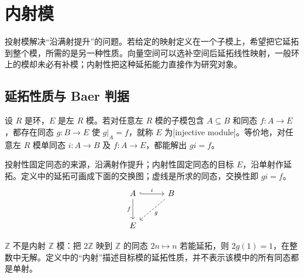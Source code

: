 
\section{内射模}
\label{b2:sec:0702}

投射模解决“沿满射提升”的问题。若给定的映射定义在一个子模上，希望把它延拓到整个模，所需的是另一种性质。向量空间可以选补空间后延拓线性映射，一般环上的模却未必有补模；内射性把这种延拓能力直接作为研究对象。

%
%

\subsection{延拓性质与 Baer 判据}
\label{b2:subsec:0702:01}

\begin{definition}\label{b2:def:injective-module}
	设 \(R\) 是环，\(E\) 是左 \(R\) 模。若对任意左 \(R\) 模的子模包含 \(A\subseteq B\) 和同态 \(f:A\to E\)，都存在同态 \(g:B\to E\) 使 \(g|_A=f\)，就称 \(E\) 为[injective module]。等价地，对任意左 \(R\) 模单同态 \(i:A\to B\) 及 \(f:A\to E\)，都能解出 \(gi=f\)。
\end{definition}

投射性固定同态的来源，沿满射作提升；内射性固定同态的目标 \(E\)，沿单射作延拓。定义中的延拓可画成下面的交换图；虚线是所求的同态，交换性即 \(gi=f\)。
\[
	\begin{tikzcd}[column sep=3em,row sep=2.5em]
		A\arrow[r,hook,"i"]\arrow[d,"f"']&B\arrow[dl,dashed,"g"]\\
		E&
	\end{tikzcd}
\]

\(\mathbb Z\) 不是内射 \(\mathbb Z\) 模：把 \(2\mathbb Z\) 映到 \(\mathbb Z\) 的同态 \(2n\mapsto n\) 若能延拓，则 \(2g(1)=1\)，在整数中无解。定义中的“内射”描述目标模的延拓性质，并不表示该模中的所有同态都是单射。

